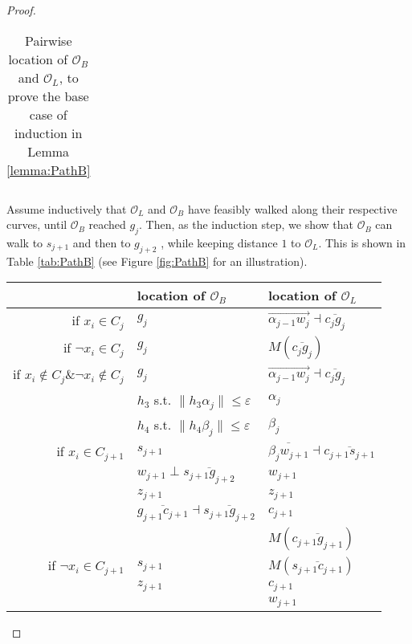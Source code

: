 \documentclass[a4paper,UKenglish]{lipics}
\newcommand{\eps}{\varepsilon}
\newcommand{\CO}{{\mathscr O}}
\newcommand{\Seg}[1]{{\overline{#1}}}
\newcommand{\Dir}{\overrightarrow}
\begin{document}
\begin{proof}
\begin{table}[h]
\begin{tabular}{ r | l | l  }
\end{tabular}
\vspace{0.2 in}
\caption{Pairwise location of $\CO_B$ and $\CO_L$, to prove the base case of induction in Lemma \ref{lemma:PathB} }
\label{tab:BaseCasePathB}
\end{table}





Assume inductively that $\CO_L$ and $\CO_B$ have feasibly walked along 
their respective curves, until $\CO_B$ reached $g_j$.
Then, as the induction step, 
we 
show that
$\CO_B$ can walk to $s_{j+1}$ and then to $g_{j+2}$ 
, while keeping distance $1$ to $\CO_L$.
This is shown in Table \ref{tab:PathB}
 (see Figure \ref{fig:PathB} for an illustration). 


\begin{table}[h]
\centering
\begin{tabular}{ r | l | l  }
  & location of $\CO_B$ & location of $\CO_L$  
 \\
\hline
   if $x_i \in C_j$  & $g_j$ & $\Dir{\alpha_{j-1}w_j} 	\dashv \Seg{c_jg_j}$ \\
   if $\neg x_i \in C_j$  & $g_j$ & $M(\Seg{c_jg_j})$\\
   if $x_i \notin C_j \& \neg x_i \notin C_j$  & $g_j$ & $\Dir{\alpha_{j-1}w_j}	\dashv \Seg{c_jg_j}$\\

\hline
	&  $h_3$ s.t.  $\| h_3\alpha_j \| \le \eps$ & $\alpha_j$\\
	&  	$h_4$ s.t.  $\| h_4 \beta_j \| \le \eps$ & $\beta_j$\\

\hline
if $x_i \in C_{j+1}$ &  				 $s_{j+1}$  & $\Seg{\beta_jw_{j+1}}	\dashv \Seg{c_{j+1}s_{j+1}}$\\
& $w_{j+1} \perp \Seg{s_{j+1}g_{j+2}}$ & $w_{j+1}$\\
& $z_{j+1}$ & $z_{j+1}$\\

&  $\Seg{g_{j+1}c_{j+1}}	\dashv \Seg{s_{j+1}g_{j+2}}$ & $c_{j+1}$ \\
&  & $M(\Seg{c_{j+1}g_{j+1}})$
 \\




if $\neg x_i \in C_{j+1}$ &  				 $s_{j+1}$  & $M(\Seg{s_{j+1}c_{j+1}})$\\

 & $z_{j+1}$ & $c_{j+1}$ \\
 &  & $w_{j+1}$ \\



\end{tabular}
\end{table}
\end{proof}
\end{document}
